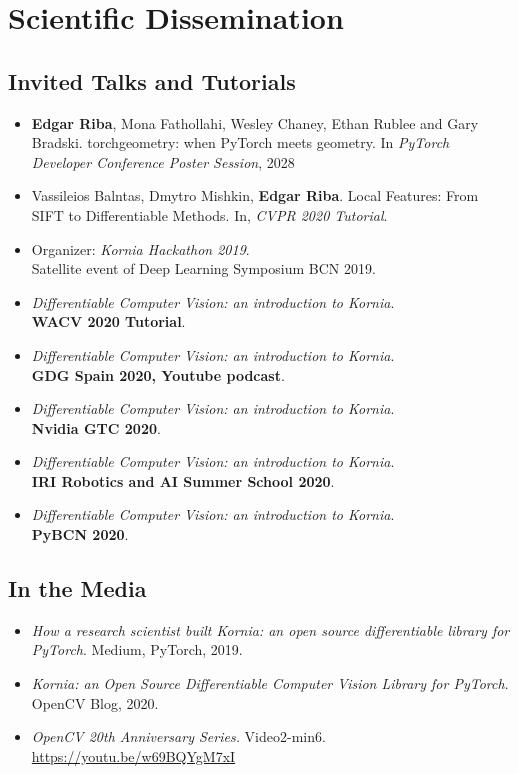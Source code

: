 \section{Scientific Dissemination}

\subsection{Invited Talks and Tutorials}
\begin{itemize}
\item \textbf{Edgar Riba}, Mona Fathollahi, Wesley Chaney, Ethan Rublee and Gary Bradski. torchgeometry: when PyTorch meets geometry. In \textit{PyTorch Developer Conference Poster Session}, 2028
\item Vassileios Balntas, Dmytro Mishkin, \textbf{Edgar Riba}. Local Features: From SIFT to Differentiable Methods. In, \textit{CVPR 2020 Tutorial}.
\item Organizer: \textit{Kornia Hackathon 2019}.\\
Satellite event of Deep Learning Symposium BCN 2019.
\item \textit{Differentiable Computer Vision: an introduction to Kornia}.\\
\textbf{WACV 2020 Tutorial}.
\item \textit{Differentiable Computer Vision: an introduction to Kornia}.\\
\textbf{GDG Spain 2020, Youtube podcast}.
\item \textit{Differentiable Computer Vision: an introduction to Kornia}.\\
\textbf{Nvidia GTC 2020}.
\item \textit{Differentiable Computer Vision: an introduction to Kornia}.\\
\textbf{IRI Robotics and AI Summer School 2020}.
\item \textit{Differentiable Computer Vision: an introduction to Kornia}.\\
\textbf{PyBCN 2020}.
\end{itemize}

\subsection{In the Media}
\begin{itemize}
\item \textit{How a research scientist built Kornia: an open source differentiable library for PyTorch}. Medium, PyTorch, 2019.
\item \textit{Kornia: an Open Source Differentiable Computer Vision Library for PyTorch}. OpenCV Blog, 2020.
\item \textit{OpenCV 20th Anniversary Series.} Video2-min6. \url{https://youtu.be/w69BQYgM7xI}
\end{itemize}

